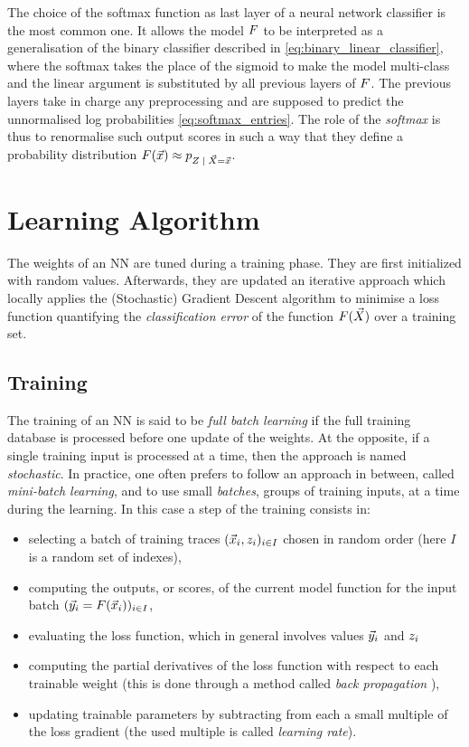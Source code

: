 The choice of the softmax function as last layer of a neural network classifier is the most common one. It allows the model $F$ to be interpreted as a generalisation of the binary classifier described in \eqref{eq:binary_linear_classifier}, where the softmax takes the place of the sigmoid to make the model multi-class and the linear argument is substituted by all previous layers of $F$. The previous layers take in charge any preprocessing and are supposed to predict the unnormalised log probabilities \eqref{eq:softmax_entries}. The role of the \emph{softmax} is thus to renormalise such output scores in such a way that they define a probability distribution $\MLmodel(\vLeakVec) \approx \pdf_{\given{\sensRandVar}{\vaLeakVec=\vLeakVec}}$. 

\section{Learning Algorithm}\label{sec:learningAlgorithm}
The weights of an NN are tuned during a training phase. They are first initialized with random values. Afterwards, they are updated  \via an
iterative approach which locally applies the (Stochastic) Gradient Descent
algorithm \cite{Goodfellow-et-al-2016} to minimise a loss function
quantifying the \emph{classification error} of the function
$F(\vec{X})$ over a training set.

\subsection{Training}\label{sec:training}
The training of an NN is said to be \emph{full batch learning} if
the full training database is processed before one update of the weights. At the opposite, if
a single training input is processed at a time, then the approach is named
\emph{stochastic}. In practice, one often prefers to follow an approach in
between, called \emph{mini-batch learning}, and to use small \emph{batches}, \ie
groups of training inputs, at a time during the learning. In this case a step of the training consists in: 
\begin{itemize}
\item selecting a batch of training traces $(\vec{x}_i, z_i)_{i\in I}$ chosen in random order (here $I$ is a random set of indexes),
\item computing the outputs, or scores, of the current model function for the input batch $(\vec{y}_i = F(\vec{x}_i))_{i\in I}$, 
\item evaluating the loss function, which in general involves values $\vec{y}_i$ and $z_i$
\item computing the partial derivatives of the loss function with respect to each trainable weight (this is done through a method called \emph{back propagation} \cite{LeCun2012}),
\item updating trainable parameters by subtracting from each a small multiple of the loss gradient (the used multiple is called \emph{learning rate}).
\end{itemize}  


